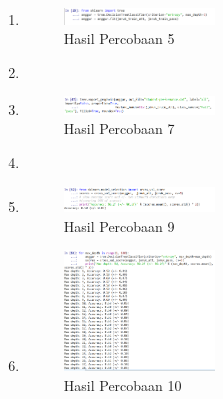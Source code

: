 \begin{enumerate}
		\item \hfill \break 
		\begin{figure}[H]
			\includegraphics[width=4cm]{figures/1174043/chapter2/hasil5.png}
			\centering
			\caption{Hasil Percobaan 5}
		\end{figure}
		
		\item \hfill \break 
		
		\item \hfill \break 
		\begin{figure}[H]
			\includegraphics[width=4cm]{figures/1174043/chapter2/hasil7.png}
			\centering
			\caption{Hasil Percobaan 7}
		\end{figure}
		
		\item \hfill \break 
		
		\item \hfill \break 
		\begin{figure}[H]
			\includegraphics[width=4cm]{figures/1174043/chapter2/hasil9.png}
			\centering
			\caption{Hasil Percobaan 9}
		\end{figure}
		
		\item \hfill \break 
		\begin{figure}[H]
			\includegraphics[width=4cm]{figures/1174043/chapter2/hasil10.png}
			\centering
			\caption{Hasil Percobaan 10}
		\end{figure}
		

\end{enumerate}
